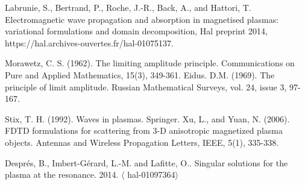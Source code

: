 \documentclass[proc]{edpsmath}
\begin{document}
\begin{thebibliography}{99}
Labrunie, S., Bertrand, P., Roche, J.-R., Back, A., and
Hattori, T. 
Electromagnetic wave propagation and absorption in
magnetised plasmas: variational formulations and
domain decomposition, Hal preprint 2014, https://hal.archives-ouvertes.fr/hal-01075137.




 Morawetz, C. S. (1962). The limiting amplitude principle. Communications on Pure and Applied Mathematics, 15(3), 349-361.
 Eidus. D.M. (1969). The principle of limit amplitude. Russian Mathematical Surveys, vol. 24, issue 3, 97-167.


 Stix, T. H. (1992). Waves in plasmas. Springer.
Xu, L., and Yuan, N. (2006). FDTD formulations for scattering from 3-D anisotropic magnetized plasma objects. Antennas and Wireless Propagation Letters, IEEE, 5(1), 335-338.

Despr\'es, B., Imbert-G\'erard, L.-M. and Lafitte, O.. Singular solutions for the plasma at the resonance. 2014. $\langle$ hal-01097364$\rangle$

\end{thebibliography}
\end{document}
